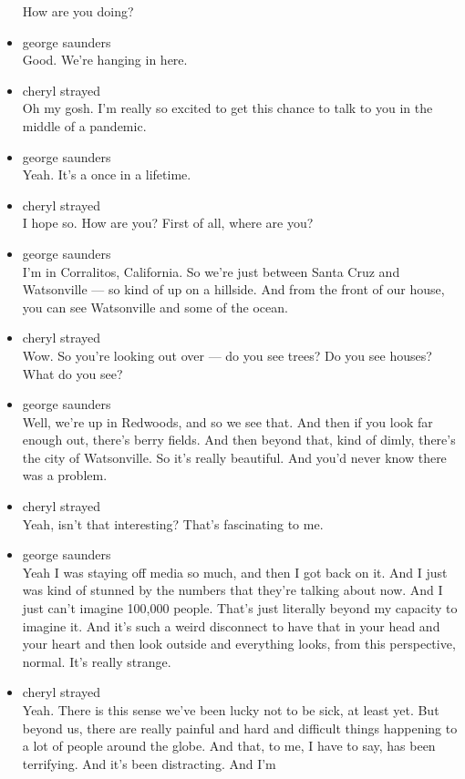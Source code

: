 \begin{itemize}
  How are you doing?
\item
  george saunders\\
  Good. We're hanging in here.
\item
  cheryl strayed\\
  Oh my gosh. I'm really so excited to get this chance to talk to you in
  the middle of a pandemic.
\item
  george saunders\\
  Yeah. It's a once in a lifetime.
\item
  cheryl strayed\\
  I hope so. How are you? First of all, where are you?
\item
  george saunders\\
  I'm in Corralitos, California. So we're just between Santa Cruz and
  Watsonville --- so kind of up on a hillside. And from the front of our
  house, you can see Watsonville and some of the ocean.
\item
  cheryl strayed\\
  Wow. So you're looking out over --- do you see trees? Do you see
  houses? What do you see?
\item
  george saunders\\
  Well, we're up in Redwoods, and so we see that. And then if you look
  far enough out, there's berry fields. And then beyond that, kind of
  dimly, there's the city of Watsonville. So it's really beautiful. And
  you'd never know there was a problem.
\item
  cheryl strayed\\
  Yeah, isn't that interesting? That's fascinating to me.
\item
  george saunders\\
  Yeah I was staying off media so much, and then I got back on it. And I
  just was kind of stunned by the numbers that they're talking about
  now. And I just can't imagine 100,000 people. That's just literally
  beyond my capacity to imagine it. And it's such a weird disconnect to
  have that in your head and your heart and then look outside and
  everything looks, from this perspective, normal. It's really strange.
\item
  cheryl strayed\\
  Yeah. There is this sense we've been lucky not to be sick, at least
  yet. But beyond us, there are really painful and hard and difficult
  things happening to a lot of people around the globe. And that, to me,
  I have to say, has been terrifying. And it's been distracting. And I'm

\end{itemize}

